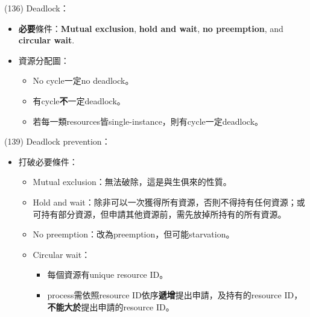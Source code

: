 \begin{theorem}{(136)} Deadlock：\begin{itemize}
        \item \textbf{必要}條件：\textbf{Mutual exclusion}, \textbf{hold and wait}, \textbf{no preemption}, and \textbf{circular wait}.
        \item 資源分配圖：\begin{itemize}
            \item No cycle一定no deadlock。
            \item 有cycle\textbf{不}一定deadlock。
            \item 若每一類resources皆single-instance，則有cycle一定deadlock。
        \end{itemize}
    \end{itemize}
\end{theorem}

\begin{theorem}{(139)} Deadlock prevention：\begin{itemize}
        \item 打破必要條件：\begin{itemize}
            \item Mutual exclusion：無法破除，這是與生俱來的性質。
            \item Hold and wait：除非可以一次獲得所有資源，否則不得持有任何資源；或可持有部分資源，但申請其他資源前，需先放掉所持有的所有資源。
            \item No preemption：改為preemption，但可能starvation。
            \item Circular wait：\begin{itemize}
                \item 每個資源有unique resource ID。
                \item process需依照resource ID依序\textbf{遞增}提出申請，及持有的resource ID，\textbf{不能大於}提出申請的resource ID。
            \end{itemize}
        \end{itemize}
    \end{itemize}
\end{theorem}

